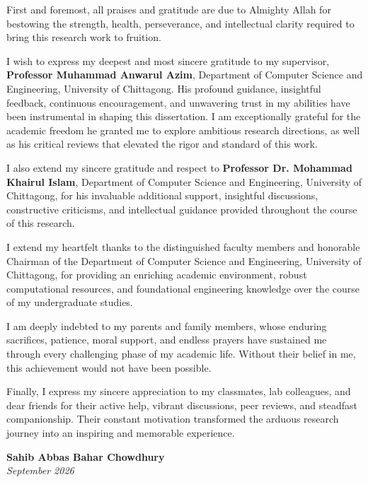 
\begin{acknowledgements}

First and foremost, all praises and gratitude are due to Almighty Allah for bestowing the strength, health, perseverance, and intellectual clarity required to bring this research work to fruition.

I wish to express my deepest and most sincere gratitude to my supervisor, \textbf{Professor Muhammad Anwarul Azim}, Department of Computer Science and Engineering, University of Chittagong. His profound guidance, insightful feedback, continuous encouragement, and unwavering trust in my abilities have been instrumental in shaping this dissertation. I am exceptionally grateful for the academic freedom he granted me to explore ambitious research directions, as well as his critical reviews that elevated the rigor and standard of this work.

I also extend my sincere gratitude and respect to \textbf{Professor Dr. Mohammad Khairul Islam}, Department of Computer Science and Engineering, University of Chittagong, for his invaluable additional support, insightful discussions, constructive criticisms, and intellectual guidance provided throughout the course of this research.

I extend my heartfelt thanks to the distinguished faculty members and honorable Chairman of the Department of Computer Science and Engineering, University of Chittagong, for providing an enriching academic environment, robust computational resources, and foundational engineering knowledge over the course of my undergraduate studies.

I am deeply indebted to my parents and family members, whose enduring sacrifices, patience, moral support, and endless prayers have sustained me through every challenging phase of my academic life. Without their belief in me, this achievement would not have been possible.

Finally, I express my sincere appreciation to my classmates, lab colleagues, and dear friends for their active help, vibrant discussions, peer reviews, and steadfast companionship. Their constant motivation transformed the arduous research journey into an inspiring and memorable experience.

\vspace{1.5cm}
\begin{flushright}
\textbf{Sahib Abbas Bahar Chowdhury}\\
\textit{September 2026}
\end{flushright}

\end{acknowledgements}
